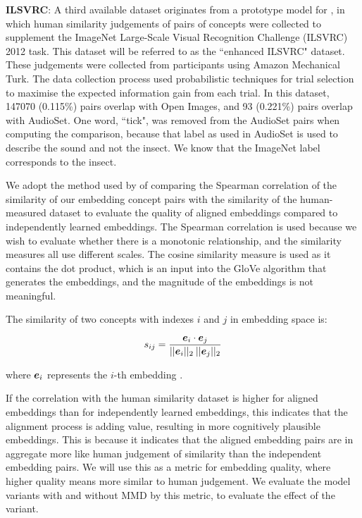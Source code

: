 \textbf{ILSVRC}: A third available dataset originates from a prototype model for \cite{RoadsLoveCVPR}, in which human similarity judgements of pairs of concepts were collected to supplement the ImageNet Large-Scale Visual Recognition Challenge (ILSVRC) 2012 task. This dataset will be referred to as the ``enhanced ILSVRC" dataset. These judgements were collected from participants using Amazon Mechanical Turk. The data collection process used probabilistic techniques for trial selection to maximise the expected information gain from each trial. In this dataset, 147070 (0.115\%) pairs overlap with Open Images, and 93 (0.221\%) pairs overlap with AudioSet. One word, ``tick", was removed from the AudioSet pairs when computing the comparison, because that label as used in AudioSet is used to describe the sound and not the insect. We know that the ImageNet label corresponds to the insect. 

We adopt the method used by \cite{mturk771} of comparing the Spearman correlation of the similarity of our embedding concept pairs with the similarity of the human-measured dataset to evaluate the quality of aligned embeddings compared to independently learned embeddings. The Spearman correlation is used because we wish to evaluate whether there is a monotonic relationship, and the similarity measures all use different scales. The cosine similarity measure is used as it contains the dot product, which is an input into the GloVe algorithm that generates the embeddings, and the magnitude of the embeddings is not meaningful. 

The similarity of two concepts with indexes $i$ and $j$ in embedding space is:

\begin{equation*}
s_{ij} = \frac{\boldsymbol{e}_i \cdot \boldsymbol{e}_j}{||\boldsymbol{e}_i||_2 \medspace ||\boldsymbol{e}_j||_2}
\end{equation*}

where $\boldsymbol{e}_i$ represents the $i$-th embedding .

If the correlation with the human similarity dataset is higher for aligned embeddings than for independently learned embeddings, this indicates that the alignment process is adding value, resulting in more cognitively plausible embeddings. This is because it indicates that the aligned embedding pairs are in aggregate more like human judgement of similarity than the independent embedding pairs. We will use this as a metric for embedding quality, where higher quality means more similar to human judgement.  We evaluate the model variants with and without MMD by this metric, to evaluate the effect of the variant. 

